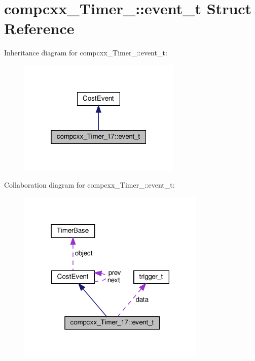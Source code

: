 \hypertarget{structcompcxx__Timer__17_1_1event__t}{}\section{compcxx\+\_\+\+Timer\+\_\+:\+:event\+\_\+t Struct Reference}
\label{structcompcxx__Timer__17_1_1event__t}


Inheritance diagram for compcxx\+\_\+\+Timer\+\_\+:\+:event\+\_\+t\+:\nopagebreak
\begin{figure}[H]
\begin{center}
\leavevmode
\includegraphics[width=220pt]{structcompcxx__Timer__17_1_1event__t__inherit__graph}
\end{center}
\end{figure}


Collaboration diagram for compcxx\+\_\+\+Timer\+\_\+:\+:event\+\_\+t\+:\nopagebreak
\begin{figure}[H]
\begin{center}
\leavevmode
\includegraphics[width=254pt]{structcompcxx__Timer__17_1_1event__t__coll__graph}
\end{center}
\end{figure}
